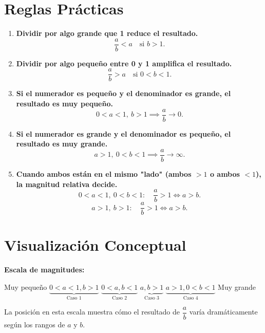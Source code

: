 \section{Reglas Prácticas}

\begin{enumerate}
\item \textbf{Dividir por algo grande que 1 reduce el resultado.}
  \[
  \frac{a}{b} < a \quad \text{si } b > 1.
  \]

\item \textbf{Dividir por algo pequeño entre 0 y 1 amplifica el resultado.}
  \[
  \frac{a}{b} > a \quad \text{si } 0 < b < 1.
  \]

\item \textbf{Si el numerador es pequeño y el denominador es grande, el resultado es muy pequeño.}
  \[
  0 < a < 1, \ b > 1 \implies \frac{a}{b} \to 0.
  \]

\item \textbf{Si el numerador es grande y el denominador es pequeño, el resultado es muy grande.}
  \[
  a > 1, \ 0 < b < 1 \implies \frac{a}{b} \to \infty.
  \]

\item \textbf{Cuando ambos están en el mismo "lado" (ambos $>1$ o ambos $<1$), la magnitud relativa decide.}
  \[
  0 < a < 1, \ 0 < b < 1: \quad \frac{a}{b} > 1 \iff a > b.
  \]
  \[
  a > 1, \ b > 1: \quad \frac{a}{b} > 1 \iff a > b.
  \]
\end{enumerate}

\section{Visualización Conceptual}

\textbf{Escala de magnitudes:}

\vspace{0.5cm}

Muy pequeño \quad $\underbrace{0 < a < 1, b > 1}_{\text{Caso 1}}$ \quad $\underbrace{0 < a, b < 1}_{\text{Caso 2}}$ \quad $\underbrace{a, b > 1}_{\text{Caso 3}}$ \quad $\underbrace{a > 1, 0 < b < 1}_{\text{Caso 4}}$ \quad Muy grande

\vspace{0.5cm}

La posición en esta escala muestra cómo el resultado de $\dfrac{a}{b}$ varía dramáticamente según los rangos de $a$ y $b$.
